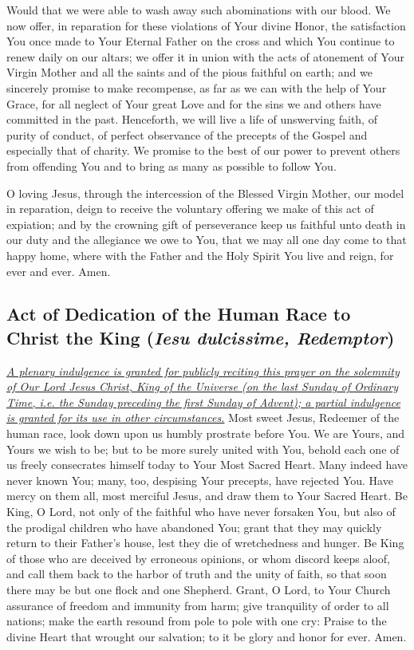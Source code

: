 \documentclass[12pt]{article}
\newcommand{\prayertitle}[1]{\subsection{#1}}
\newcommand{\indulgencedprayertitle}[1]{\prayertitle{#1 \protect\kreuz}}
\newcommand{\emphasis}[1]{\emph{#1}}
\newcommand{\emphasis}[1]{\textsl{#1}}
\newcommand{\foreign}[1]{\emphasis{#1}}
\newcommand{\note}[1]{{\small{\emphasis{#1}}}\newline}
\newcommand{\linkednote}[2]{\hyperlink{#1}{\note{#2}}}
\begin{document}
Would that we were able to wash away such abominations with our blood.
We now offer, in reparation for these violations of Your divine Honor, the satisfaction You once made to Your Eternal Father on the cross and which You continue to renew daily on our altars;
we offer it in union with the acts of atonement of Your Virgin Mother and all the saints and of the pious faithful on earth;
and we sincerely promise to make recompense, as far as we can with the help of Your Grace, for all neglect of Your great Love and for the sins we and others have committed in the past.
Henceforth, we will live a life of unswerving faith, of purity of conduct, of perfect observance of the precepts of the Gospel and especially that of charity.
We promise to the best of our power to prevent others from offending You and to bring as many as possible to follow You.

O loving Jesus, through the intercession of the Blessed Virgin Mother, our model in reparation, deign to receive the voluntary offering we make of this act of expiation;
and by the crowning gift of perseverance keep us faithful unto death in our duty and the allegiance we owe to You, that we may all one day come to that happy home, where with the Father and the Holy Spirit You live and reign, for ever and ever. Amen.

\indulgencedprayertitle{Act of Dedication of the Human Race to Christ the King (\foreign{Iesu dulcissime, Redemptor})}
\linkednote{grant2}{A plenary indulgence is granted for publicly reciting this prayer on the solemnity of Our Lord Jesus Christ, King of the Universe (on the last Sunday of Ordinary Time, i.e. the Sunday preceding the first Sunday of Advent);
a partial indulgence is granted for its use in other circumstances.}
Most sweet Jesus, Redeemer of the human race, look down upon us humbly prostrate before You.
We are Yours, and Yours we wish to be;
but to be more surely united with You, behold each one of us freely consecrates himself today to Your Most Sacred Heart.
Many indeed have never known You;
many, too, despising Your precepts, have rejected You.
Have mercy on them all, most merciful Jesus, and draw them to Your Sacred Heart.
Be King, O Lord, not only of the faithful who have never forsaken You, but also of the prodigal children who have abandoned You;
grant that they may quickly return to their Father's house, lest they die of wretchedness and hunger.
Be King of those who are deceived by erroneous opinions, or whom discord keeps aloof, and call them back to the harbor of truth and the unity of faith, so that soon there may be but one flock and one Shepherd.
Grant, O Lord, to Your Church assurance of freedom and immunity from harm;
give tranquility of order to all nations;
make the earth resound from pole to pole with one cry:
Praise to the divine Heart that wrought our salvation;
to it be glory and honor for ever.
Amen.
\end{document}
